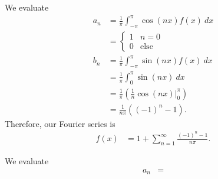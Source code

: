 \documentclass[10pt]{mypackage}
\begin{document}
\RaggedRight
\begin{solution}[11.2, Problem 2]
  We evaluate
  \begin{align*}
    a_n &= \frac{1}{\pi}\int_{-\pi}^{\pi} \cos\left( nx \right)f(x)\:dx\\
        &= \begin{cases}
          1 & n = 0\\
          0 & \text{else}
        \end{cases}\\
    b_n &= \frac{1}{\pi}\int_{-\pi}^{\pi} \sin\left( nx \right)f(x)\:dx\\
        &= \frac{1}{\pi}\int_{0}^{\pi} \sin\left( nx \right)\:dx\\
        &= \frac{1}{\pi}\left( \frac{1}{n}\cos\left( nx \right)\biggr\vert_{0}^{\pi} \right)\\
        &= \frac{1}{n\pi}\left( \left( -1 \right)^{n}-1 \right).
  \end{align*}
  Therefore, our Fourier series is
  \begin{align*}
    f(x) &= 1 + \sum_{n=1}^{\infty}\frac{\left( -1 \right)^{n}-1}{n\pi}.
  \end{align*}
\end{solution}
\begin{solution}[11.2, Problem 8]
  We evaluate
  \begin{align*}
    a_n &= 
  \end{align*}
  
\end{solution}
\begin{solution}[11.2, Problem 10]

\end{solution}
\begin{solution}[11.2, Problem 17]

\end{solution}
\begin{solution}[11.2, Problem 18]

\end{solution}
\begin{solution}[11.3, Problem 6]

\end{solution}
\begin{solution}[11.3, Problem 10]

\end{solution}
\begin{solution}[11.3, Problem 12]

\end{solution}
\end{document}
